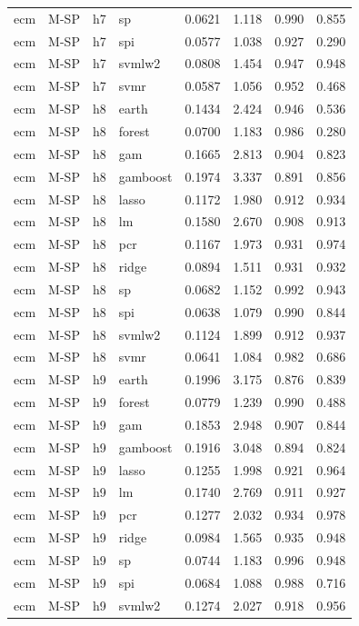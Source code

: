 \begin{ThreePartTable}
\begin{longtable}[t]{llclcccc}
ecm & M-SP & h7 & sp & 0.0621 & 1.118 & 0.990 & 0.855\\
ecm & M-SP & h7 & spi & 0.0577 & 1.038 & 0.927 & 0.290\\
ecm & M-SP & h7 & svmlw2 & 0.0808 & 1.454 & 0.947 & 0.948\\
ecm & M-SP & h7 & svmr & 0.0587 & 1.056 & 0.952 & 0.468\\
\addlinespace
ecm & M-SP & h8 & earth & 0.1434 & 2.424 & 0.946 & 0.536\\
ecm & M-SP & h8 & forest & 0.0700 & 1.183 & 0.986 & 0.280\\
ecm & M-SP & h8 & gam & 0.1665 & 2.813 & 0.904 & 0.823\\
ecm & M-SP & h8 & gamboost & 0.1974 & 3.337 & 0.891 & 0.856\\
ecm & M-SP & h8 & lasso & 0.1172 & 1.980 & 0.912 & 0.934\\
ecm & M-SP & h8 & lm & 0.1580 & 2.670 & 0.908 & 0.913\\
ecm & M-SP & h8 & pcr & 0.1167 & 1.973 & 0.931 & 0.974\\
ecm & M-SP & h8 & ridge & 0.0894 & 1.511 & 0.931 & 0.932\\
ecm & M-SP & h8 & sp & 0.0682 & 1.152 & 0.992 & 0.943\\
ecm & M-SP & h8 & spi & 0.0638 & 1.079 & 0.990 & 0.844\\
ecm & M-SP & h8 & svmlw2 & 0.1124 & 1.899 & 0.912 & 0.937\\
ecm & M-SP & h8 & svmr & 0.0641 & 1.084 & 0.982 & 0.686\\
\addlinespace
ecm & M-SP & h9 & earth & 0.1996 & 3.175 & 0.876 & 0.839\\
ecm & M-SP & h9 & forest & 0.0779 & 1.239 & 0.990 & 0.488\\
ecm & M-SP & h9 & gam & 0.1853 & 2.948 & 0.907 & 0.844\\
ecm & M-SP & h9 & gamboost & 0.1916 & 3.048 & 0.894 & 0.824\\
ecm & M-SP & h9 & lasso & 0.1255 & 1.998 & 0.921 & 0.964\\
ecm & M-SP & h9 & lm & 0.1740 & 2.769 & 0.911 & 0.927\\
ecm & M-SP & h9 & pcr & 0.1277 & 2.032 & 0.934 & 0.978\\
ecm & M-SP & h9 & ridge & 0.0984 & 1.565 & 0.935 & 0.948\\
ecm & M-SP & h9 & sp & 0.0744 & 1.183 & 0.996 & 0.948\\
ecm & M-SP & h9 & spi & 0.0684 & 1.088 & 0.988 & 0.716\\
ecm & M-SP & h9 & svmlw2 & 0.1274 & 2.027 & 0.918 & 0.956\\

\end{longtable}
\end{ThreePartTable}
